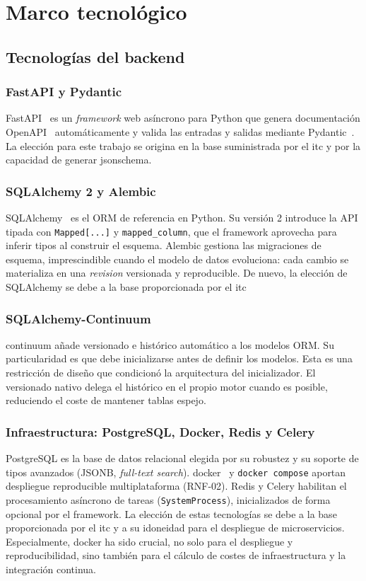 \chapter{Marco tecnológico}

\section{Tecnologías del backend}

\subsection{FastAPI y Pydantic}
FastAPI~\cite{fastapi} es un \emph{framework} web asíncrono para Python que
genera documentación OpenAPI~\cite{openapi} automáticamente y valida las entradas y salidas
mediante Pydantic~\cite{pydantic}. La elección para este trabajo se origina en la base suministrada
por el \gls{itc} y por la capacidad de generar \gls{jsonschema}.

\subsection{SQLAlchemy 2 y Alembic}
SQLAlchemy~\cite{sqlalchemy} es el ORM de referencia en Python. Su versión
2 introduce la API tipada con \texttt{Mapped[...]} y \texttt{mapped\_column},
que el framework aprovecha para inferir tipos al construir el esquema. Alembic
gestiona las migraciones de esquema, imprescindible cuando el modelo de datos
evoluciona: cada cambio se materializa en una \emph{revision} versionada y
reproducible. De nuevo, la elección de SQLAlchemy se debe a la base proporcionada por el \gls{itc}

\subsection{SQLAlchemy-Continuum}
\gls{continuum} añade versionado e histórico automático a los modelos ORM. Su
particularidad es que debe inicializarse antes de definir los modelos. Esta es una
restricción de diseño que condicionó la arquitectura del inicializador. El
versionado nativo delega el histórico en el propio motor cuando es posible,
reduciendo el coste de mantener tablas espejo.

\subsection{Infraestructura: PostgreSQL, Docker, Redis y Celery}
PostgreSQL es la base de datos relacional elegida por su robustez y su soporte
de tipos avanzados (JSONB, \emph{full-text search}). \gls{docker}~\cite{docker} y
\texttt{docker compose} aportan despliegue reproducible multiplataforma
(RNF-02). Redis y Celery habilitan el procesamiento asíncrono de tareas
(\texttt{SystemProcess}), inicializados de forma opcional por el framework.
La elección de estas tecnologías se debe a la base proporcionada por el \gls{itc} 
y a su idoneidad para el despliegue de microservicios. Especialmente, \gls{docker}
ha sido crucial, no solo para el despliegue y reproducibilidad, sino también para
el cálculo de costes de infraestructura y la integración continua.

